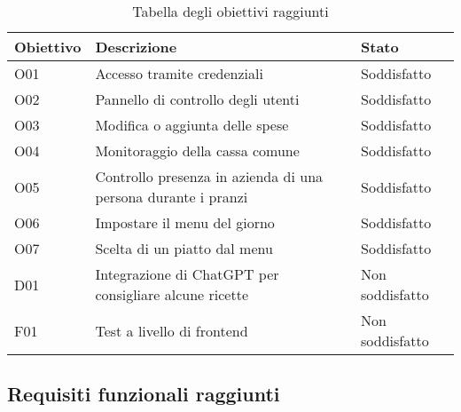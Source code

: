 \begin{table}[htb]%
    \caption{Tabella degli obiettivi raggiunti}
    \label{tab:obiettivi-raggiunti}
    \begin{tabularx}{\textwidth}{lXl}
    \hline
    \textbf{Obiettivo} & \textbf{Descrizione} & \textbf{Stato}\\
    \hline\hline
    O01     & Accesso tramite credenziali & Soddisfatto \\
    \hline
    O02     & Pannello di controllo degli utenti & Soddisfatto \\
    \hline
    O03     & Modifica o aggiunta delle spese & Soddisfatto \\
    \hline
    O04     & Monitoraggio della cassa comune & Soddisfatto \\
    \hline
    O05     & Controllo presenza in azienda di una persona durante i pranzi & Soddisfatto \\
    \hline
    O06     & Impostare il menu del giorno & Soddisfatto \\
    \hline
    O07     & Scelta di un piatto dal menu & Soddisfatto \\
    \hline
    D01     & Integrazione di ChatGPT per consigliare alcune ricette & Non soddisfatto \\
    \hline
    F01     & Test a livello di frontend & Non soddisfatto \\
    \hline
    \end{tabularx}
\end{table}%

\newpage

\subsection{Requisiti funzionali raggiunti}

